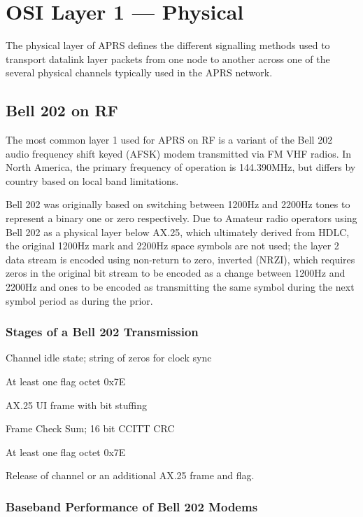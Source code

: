 \part{OSI Layer 1 --- Physical}

The physical layer of APRS defines the different signalling methods used
to transport datalink layer packets from one node to another across one of
the several physical channels typically used in the APRS network.


\chapter{Bell 202 on RF}

The most common layer 1 used for APRS on RF is a variant of the
Bell 202 audio frequency shift keyed (AFSK) modem transmitted via 
FM VHF radios. In North America, the primary frequency of operation is
144.390MHz, but differs by country based on local band limitations.

Bell 202 was originally  based on switching between 1200Hz and 2200Hz tones to
represent a binary one or zero respectively. Due to Amateur radio operators
using Bell 202 as a physical layer below AX.25, which ultimately derived 
from HDLC, the original 1200Hz mark and 2200Hz space symbols are not used;
the layer 2 data stream is encoded using 
non-return to zero, inverted (NRZI),
which requires zeros in the original bit stream to be encoded as a change
between 1200Hz and 2200Hz and ones to be encoded as transmitting the same
symbol during the next symbol period as during the prior.

\section{Stages of a Bell 202 Transmission}

Channel idle state; string of zeros for clock sync

At least one flag octet 0x7E

AX.25 UI frame with bit stuffing

Frame Check Sum; 16 bit CCITT CRC

At least one flag octet 0x7E

Release of channel or an additional AX.25 frame and flag. 

\section{Baseband Performance of Bell 202 Modems}


